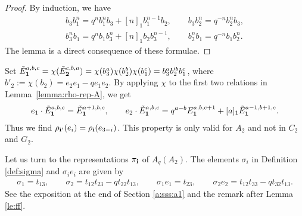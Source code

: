 \documentclass[pdftex]{sigma}
\begin{document}
\begin{proof}
By induction, we have
\begin{gather*}
{b_3 b_1^n} = q^n {b_1^n b_3}+[n]_1 {b_1^{n-1} b_2},  \qquad
{b_3 b_2^n} = q^{-n} {b_2^n b_3},\\
{b_3^n b_1} = q^n {b_1 b_3^n}+[n]_1 {b_2 b_3^{n-1}},  \qquad
{b_2^n b_1} = q^{-n} {b_1 b_2^n}.
\end{gather*}
The lemma is a direct consequence of these formulae.
\end{proof}

Set
${\tilde E}^{a,b,c}_{\bf 1} = \chi({\tilde E}^{c,b,a}_{\bf 2})
= \chi(b^a_3)\chi(b^b_2)\chi(b^c_1)
=b_3^ab_2^{\prime b}b_1^c$,
where $b'_2 := \chi(b_2) = e_2e_1-qe_1e_2$.
By applying $\chi$ to the f\/irst two relations
in Lemma~\ref{lemma:rho-rep-A}, we get
\begin{gather}\label{a:kore}
e_1\cdot {\tilde E}^{a,b,c}_{\bf 1} = {\tilde E}^{a+1,b,c}_{\bf 1},
\qquad
e_2\cdot {\tilde E}^{a,b,c}_{\bf 1} = q^{a-b}E^{a,b,c+1}_{\bf 1}
+[a]_1{\tilde E}^{a-1,b+1,c}_{\bf 1}.
\end{gather}
Thus we f\/ind $\rho_{{\bf i}'}(e_i) = \rho_{\bf i}(e_{3-i})$.
This property is only valid for $A_2$ and not in $C_2$ and $G_2$.

Let us turn to the representations $\pi_{{\bf i}}$ of $A_q(A_2)$.
The elements $\sigma_i$ in Def\/inition \ref{def:sigma}
and $\sigma_ie_i$
are given by{\samepage
\begin{gather}\label{a:kobetsu}
\sigma_1 = t_{13}, \qquad
\sigma_2 = t_{12}t_{23}-qt_{22}t_{13},\qquad
\sigma_1 e_1 = t_{23},\qquad
\sigma_2e_2 = t_{12}t_{33}-qt_{32}t_{13}.
\end{gather}
See the exposition at the end of Section \ref{a:sss:a1} and the remark after
Lemma \ref{le:ff}.}
\end{document}
